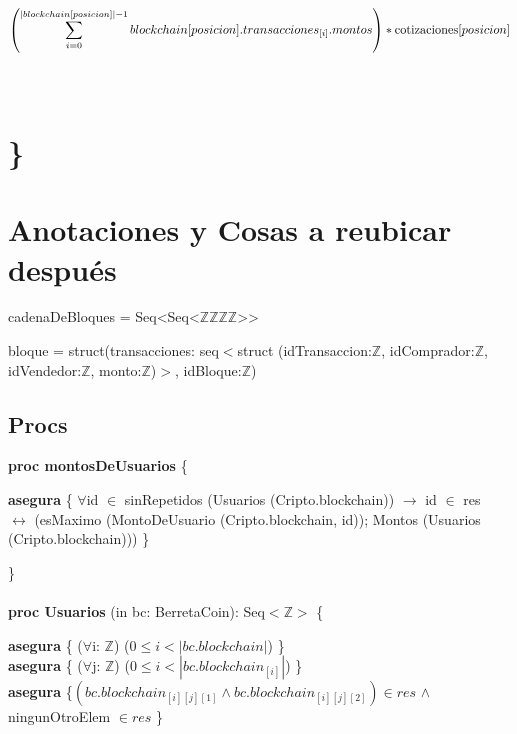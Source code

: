 \documentclass{article}
\newcommand{\Entero}{$\mathds{Z}$}
\newcommand{\tuplaDeTuplaDeCuatroEnteros}{{Seq\textless Seq\textless\Entero\texttimes\Entero\texttimes\Entero\texttimes\Entero\textgreater\textgreater}}
\begin{document}
        \indent\indent $\left( \mathlarger{\sum\limits_{i=0}^{|blockchain[posicion]|-1} blockchain[posicion].transacciones_{[i]}.montos} \right) * \text{cotizaciones}[posicion]$\\\\\\



\section*{\}}

\newpage
\section*{Anotaciones y Cosas a reubicar después}
cadenaDeBloques = \tuplaDeTuplaDeCuatroEnteros

bloque = struct(transacciones: seq$<$struct (idTransaccion:\Entero, idComprador:\Entero,
                                            idVendedor:\Entero, monto:\Entero)$>$, idBloque:\Entero)

\subsection*{Procs}
\textbf{proc montosDeUsuarios} \{

        \indent\indent \textbf{asegura} \{ $\forall$id $\in$ sinRepetidos (Usuarios (Cripto.blockchain)) $\rightarrow$ id $\in$ res\\
        \indent\indent\indent\indent\indent $\longleftrightarrow$ (esMaximo (MontoDeUsuario (Cripto.blockchain, id));
                                            Montos (Usuarios (Cripto.blockchain))) \}

    \}\\\\

\textbf{proc Usuarios} (in bc: BerretaCoin): Seq$<$\Entero$>$ \{

    \indent\indent \textbf{asegura} \{ ($\forall$i: \Entero) ($0 \le i < |bc.blockchain|$) \}\\

    \indent\indent \textbf{asegura} \{ ($\forall$j: \Entero) ($0 \le i < |bc.blockchain_{[i]}|$) \}\\

    \indent\indent \textbf{asegura} \{$ (bc.blockchain_{[i][j][1]} \land bc.blockchain_{[i][j][2]}) \in res$
                                            $\land$ ningunOtroElem $\in res$ \}
    
\end{document}
